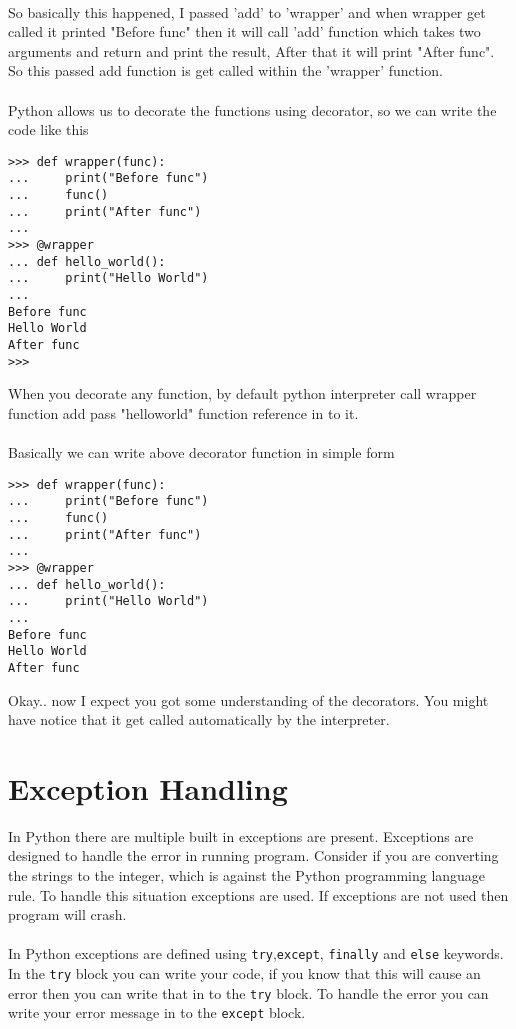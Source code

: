 \documentclass[letterpaper,12pt]{book}
\begin{document}
\paragraph{}
So basically this happened, I passed 'add' to 'wrapper' and when wrapper get called it printed "Before func" then it will call 'add' function which takes two arguments and return and print the result, After that it will print "After func". So this passed add function is get called within the 'wrapper' function. 
\paragraph{}
Python allows us to decorate the functions using decorator, so we can write the code like this
\begin{lstlisting}
>>> def wrapper(func):
...     print("Before func")
...     func()
...     print("After func")
... 
>>> @wrapper
... def hello_world():
...     print("Hello World")
... 
Before func
Hello World
After func
>>> 
\end{lstlisting}

When you decorate any function, by default python interpreter call wrapper function add pass "hello\textunderscore world" function reference in to it.
\paragraph{}
Basically we can write above decorator function in simple form
\begin{lstlisting}
>>> def wrapper(func):
...     print("Before func")
...     func()
...     print("After func")
...
>>> @wrapper
... def hello_world():
...     print("Hello World")
...
Before func
Hello World
After func
\end{lstlisting}
Okay.. now I expect you got some understanding of the decorators. You might have notice that it get called automatically by the interpreter.

\section{Exception Handling}
In Python there are multiple built in exceptions are present. Exceptions are designed to handle the error in running program. Consider if you are converting the strings to the integer, which is against the Python programming language rule. To handle this situation exceptions are used. If exceptions are not used then program will crash.
\paragraph{}
In Python exceptions are defined using \texttt{try},\texttt{except}, \texttt{finally} and \texttt{else} keywords. In the \texttt{try} block you can write your code, if you know that this will cause an error then you can write that in to the \texttt{try} block. To handle the error you can write your error message in to the \texttt{except} block.
\end{document}
